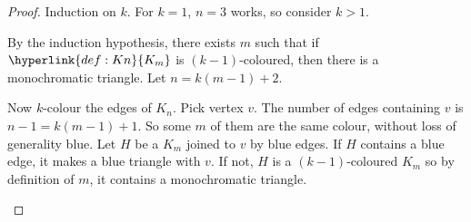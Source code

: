 \documentclass{article}
\begin{document}
\begin{proof}
    Induction on $k$. For $k=1$, $n=3$ works, so consider $k>1$.

    By the induction hypothesis, there exists $m$ such that if $\hyperlink{def:Kn}{K_m}$ is $(k-1)$-coloured, then there is a monochromatic triangle.  Let $n = k(m-1) + 2$.

    Now $k$-colour the edges of $K_n$.  Pick vertex $v$.
    The number of edges containing $v$ is $n-1 = k(m-1)+1$.  So some $m$ of them are the same colour, without loss of generality blue.
    Let $H$ be a $K_m$ joined to $v$ by blue edges. If $H$ contains a blue edge, it makes a blue triangle with $v$.
    If not, $H$ is a $(k-1)$-coloured $K_m$ so by definition of $m$, it contains a monochromatic triangle.
    \begin{center}
    \end{center}
\end{proof}
\end{document}
